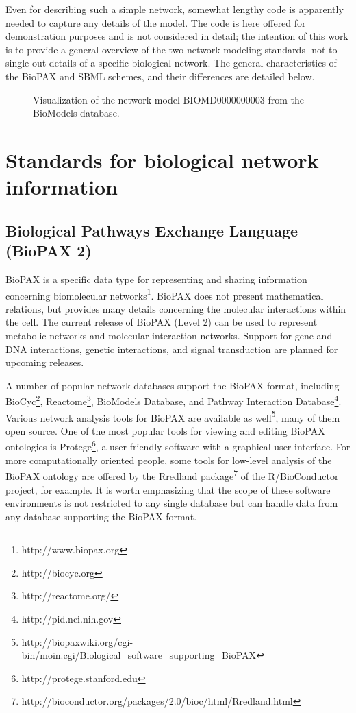 \documentclass[a4paper,10pt,titlepage]{article}
\begin{document}
Even for describing such a simple network, somewhat lengthy code is apparently needed to capture any details of the model. The code is here offered for demonstration purposes and is not considered in detail; the intention of this work is to provide a general overview of the two network modeling standards- not to single out details of a specific biological network. The general characteristics of the BioPAX and SBML schemes, and their differences are detailed below. 

\begin{figure}[h]
\caption{Visualization of the network model BIOMD0000000003 from the BioModels database.}
\label{fig:BioModel}
\end{figure}


\section{Standards for biological network information}

\subsection{Biological Pathways Exchange Language (BioPAX 2)}

BioPAX \cite{BioPAX05} is a specific data type for representing and sharing information concerning biomolecular networks\footnote{http://www.biopax.org}. BioPAX does not present mathematical relations, but provides many details concerning the molecular interactions within the cell. The current release of BioPAX (Level 2) can be used to represent metabolic networks and molecular interaction networks. Support for gene and DNA interactions, genetic interactions, and signal transduction are planned for upcoming releases.

A number of popular network databases support the BioPAX format,  including BioCyc\footnote{http://biocyc.org}, Reactome\footnote{http://reactome.org/}, BioModels Database, and Pathway Interaction Database\footnote{http://pid.nci.nih.gov}. Various network analysis tools for BioPAX are available as well\footnote{http://biopaxwiki.org/cgi-bin/moin.cgi/Biological\_software\_supporting\_BioPAX}, many of them open source. One of the most popular tools for viewing and editing BioPAX ontologies is Protege\footnote{http://protege.stanford.edu}, a user-friendly software with a graphical user interface. For more computationally oriented people, some tools for low-level analysis of the BioPAX ontology are offered by the Rredland package\footnote{http://bioconductor.org/packages/2.0/bioc/html/Rredland.html} of the R/BioConductor project, for example. It is worth emphasizing that the scope of these software environments is not restricted to any single database but can handle data from any database supporting the BioPAX format.
\end{document}

